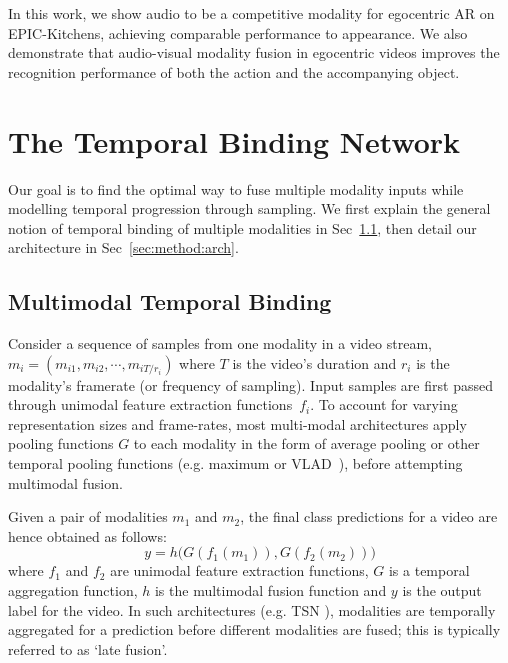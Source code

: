\documentclass[10pt,twocolumn,letterpaper]{article}
\begin{document}
In this work, we show audio to be a competitive modality for egocentric AR on EPIC-Kitchens, achieving comparable performance to appearance. We also demonstrate that audio-visual modality fusion in egocentric videos improves the recognition performance of both the action and the accompanying object.  



\vspace*{-1pt}
\section{The Temporal Binding Network}
\label{sec:tbw}
\vspace*{-3pt}
Our goal is to find the optimal way to fuse multiple modality inputs while modelling temporal progression through sampling. 
We first explain the general notion of temporal binding of multiple modalities in Sec~\ref{sec:method:tbw}, then detail our architecture in Sec~\ref{sec:method:arch}. 

\subsection{Multimodal Temporal Binding}
\label{sec:method:tbw}
Consider a sequence of samples from one modality in a video stream,
$m_i = (m_{i1}, m_{i2}, \cdots, m_{iT/r_i})$
where $T$ is the video's duration and $r_i$ is the modality's framerate (or frequency of sampling).
Input samples are first passed through unimodal feature extraction functions~$f_i$.
To account for varying representation sizes and frame-rates, most multi-modal architectures apply pooling functions $G$ to each modality in the form of average pooling or other temporal pooling functions (e.g. maximum or VLAD~\cite{Jegou2010}), before attempting multimodal fusion. 

Given a pair of modalities $m_1$ and $m_2$, the final class predictions for a video are hence obtained as follows:
\begin{equation}\label{eq:unimodal_aggregation}
    y = h\big(G(f_1(m_1)), G(f_2(m_2))\big)
\end{equation}
where $f_1$ and $f_2$ are unimodal feature extraction functions, $G$ is a temporal aggregation function, $h$ is the multimodal fusion function and $y$ is the output label for the video. 
In such architectures (e.g. TSN \cite{TSN2016ECCV}), modalities are temporally aggregated for a prediction before different modalities are fused; this is typically referred to as `late fusion'. 
\end{document}

